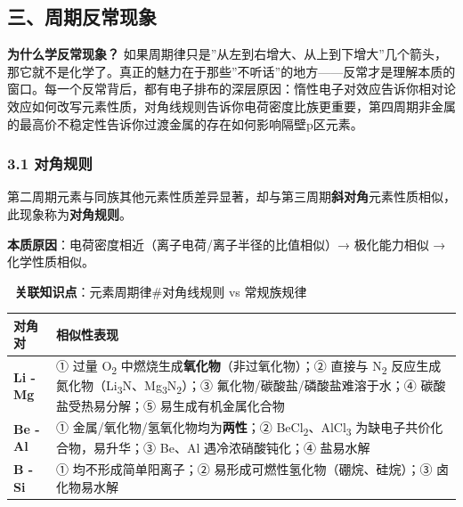 \documentclass[a4paper,11pt]{ctexart}
\newcounter{none}
\begin{document}
\subsection{三、周期反常现象}\label{ux4e09ux5468ux671fux53cdux5e38ux73b0ux8c61}

\textbf{为什么学反常现象？} 如果周期律只是''从左到右增大、从上到下增大''几个箭头，那它就不是化学了。真正的魅力在于那些''不听话''的地方------反常才是理解本质的窗口。每一个反常背后，都有电子排布的深层原因：惰性电子对效应告诉你相对论效应如何改写元素性质，对角线规则告诉你电荷密度比族更重要，第四周期非金属的最高价不稳定性告诉你过渡金属的存在如何影响隔壁p区元素。

\subsubsection{3.1 对角规则}\label{ux5bf9ux89d2ux89c4ux5219}

第二周期元素与同族其他元素性质差异显著，却与第三周期\textbf{斜对角}元素性质相似，此现象称为\textbf{对角规则}。

\textbf{本质原因}：电荷密度相近（离子电荷/离子半径的比值相似）→ 极化能力相似 → 化学性质相似。

🔗 \textbf{关联知识点}：元素周期律\#对角线规则 vs 常规族规律

{\def\LTcaptype{none} %
\begin{longtable}[]{@{}
  >{\raggedright\arraybackslash}p{}
  >{\raggedright\arraybackslash}p{}@{}}
\toprule\noalign{}
\begin{minipage}[b]{\linewidth}\raggedright
对角对
\end{minipage} & \begin{minipage}[b]{\linewidth}\raggedright
相似性表现
\end{minipage} \\
\midrule\noalign{}
\endhead
\bottomrule\noalign{}
\endlastfoot
\textbf{Li - Mg} & ① 过量 O\textsubscript{2} 中燃烧生成\textbf{氧化物}（非过氧化物）；② 直接与 N\textsubscript{2} 反应生成氮化物（Li\textsubscript{3}N、Mg\textsubscript{3}N\textsubscript{2}）；③ 氟化物/碳酸盐/磷酸盐难溶于水；④ 碳酸盐受热易分解；⑤ 易生成有机金属化合物 \\
\textbf{Be - Al} & ① 金属/氧化物/氢氧化物均为\textbf{两性}；② BeCl\textsubscript{2}、AlCl\textsubscript{3} 为缺电子共价化合物，易升华；③ Be、Al 遇冷浓硝酸钝化；④ 盐易水解 \\
\textbf{B - Si} & ① 均不形成简单阳离子；② 易形成可燃性氢化物（硼烷、硅烷）；③ 卤化物易水解 \\
\end{longtable}
}
\end{document}
